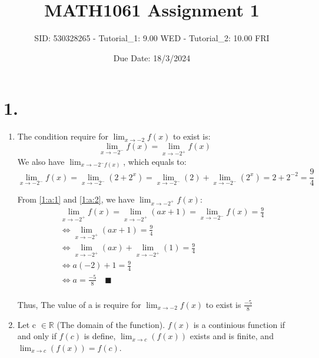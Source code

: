 \documentclass{article}
\title{MATH1061 Assignment 1}
\author{SID: 530328265 - Tutorial\_1: 9.00 WED - Tutorial\_2: 10.00 FRI}
\date{Due Date: 18/3/2024}
\begin{document}
	\maketitle
	\section*{1. }
	\begin{enumerate}[label=({\alph*})]
        \item The condition require for \(\lim_{x\to-2} f(x)\) to exist is:
        \begin{equation}
            \lim_{x\to-2^-} f(x) = \lim_{x\to-2^+} f(x) \quad \label{1:a:1}  
        \end{equation}
        We also have \(\lim_{x\to-2^- f(x)}\), which equals to:\
        \begin{equation}
            \lim_{x\to-2^-} f(x) = \lim_{x\to-2^-} (2 + 2^x) = \lim_{x\to-2^-}(2) + \lim_{x\to-2^-}(2^x) = 2 + 2^{-2} = \frac{9}{4} \quad \label{1:a:2}
        \end{equation}

        From \eqref{1:a:1} and \eqref{1:a:2}, we have \(\lim_{x\to-2^+} f(x)\):
        \begin{align*}
            &\lim_{x\to-2^+} f(x) = \lim_{x\to-2^+} (ax + 1) = \lim_{x\to-2^-} f(x) = \frac{9}{4}\\
            &\Leftrightarrow \lim_{x\to-2^+} (ax + 1) = \frac{9}{4}\\
            &\Leftrightarrow \lim_{x\to-2^+}(ax) + \lim_{x\to-2^+}(1) = \frac{9}{4}\\
            &\Leftrightarrow a(-2) + 1 = \frac{9}{4}\\
            &\Leftrightarrow a = \frac{-5}{8} \quad \blacksquare\\    
        \end{align*}
        
        Thus, The value of a is require for \(\lim_{x\to-2} f(x)\) to exist is \(\frac{-5}{8}\)

        \item Let c \(\in \mathbb{R}\) (The domain of the function). \(f(x)\) is a continious function if and only if \(f(c)\) is define, \(\lim_{x \to c}(f(x))\) exists and is finite, and \(\lim_{x \to c}(f(x)) = f(c)\). 
        

\end{enumerate}
\end{document}
